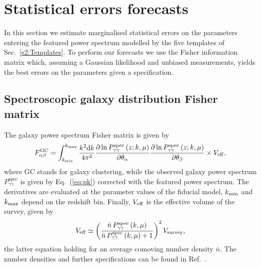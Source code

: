 \documentclass[12pt]{article}
\begin{document}





\setcounter{equation}{0} 
\section{Statistical errors forecasts} \label{s4:forecasts}



In this section we estimate marginalised statistical errors on the parameters entering the featured power spectrum modelled by the five templates of Sec.~\ref{s2:Templates}. To perform our forecasts we use the Fisher information matrix \cite{TegmarkBZ} which, assuming a Gaussian likelihood and unbiased measurements, yields the best errors on the parameters given a specification. 


\subsection{Spectroscopic galaxy distribution Fisher matrix}
The galaxy  power spectrum Fisher matrix is given by \cite{SeoPU}
\begin{equation}
F_{\alpha\beta}^\mathrm{GC} = 
\int_{k_{\rm min}}^{k_{\rm max}}\frac{k^{2}{\rm d}k}{4\pi^{2}}
\frac{\partial\ln P_{\gamma\gamma}^\mathrm{spec}\left(z;k,\mu\right)}{\partial\theta_\alpha}
\frac{\partial\ln P_{\gamma\gamma}^\mathrm{spec}\left(z;k,\mu\right)}{\partial\theta_\beta}
\times V_{\rm eff},
\label{eq:FisherMatrix}
\end{equation}
where GC stands for galaxy clustering, while the observed galaxy power spectrum $P_{\gamma\gamma}^\mathrm{spec}$ is given by Eq.~(\ref{eq:pk}) corrected with the featured power spectrum. The derivatives are evaluated at the parameter values of the fiducial model, $k_{\rm min}$ and $k_{\rm max}$ depend on the redshift bin. Finally, $V_{\rm eff}$ is the effective volume of the survey, given by
\begin{equation}
V_{\rm eff} \simeq   
\left(\frac{\bar n\,P_{\gamma\gamma}^\mathrm{spec}\left(k,\mu\right)}{\bar n\, P_{\gamma\gamma}^\mathrm{spec} \left(k,\mu\right)+1}\right)^{2}V_{\rm survey},
\label{eq:Volume}
\end{equation}
the latter equation holding for an average comoving number density $\bar n$. The number densities and further specifications can be found in Ref.~\cite{Chen:2016vvw}. 
\end{document}
